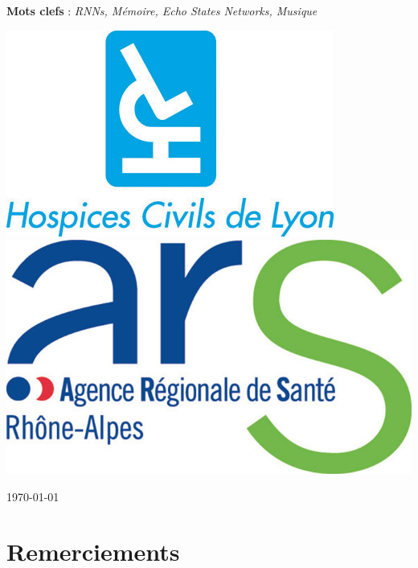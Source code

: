 \documentclass[11pt,a4paper]{article}
\theoremstyle{plain}
\theoremstyle{definition}
\begin{document}
\begin{center}
{} %


\vspace{0.5cm}

\parbox{15cm}{
\textbf{Mots clefs} : \it RNNs, Mémoire, Echo States Networks, Musique
} %

\vspace{1.5cm}

\parbox{15cm}{

\includegraphics{logo-hcl-plein_2995-bleu.jpg} \hfill
\includegraphics[scale=0.15]{ARS-Auvergne-Rhone-Alpes.jpg}
} %

\vspace{0.5cm}
\vspace{0.5cm}
\end{center}

\vfill
\hfill \today
\newpage
\thispagestyle{empty}
\section*{Remerciements}
\end{document}
